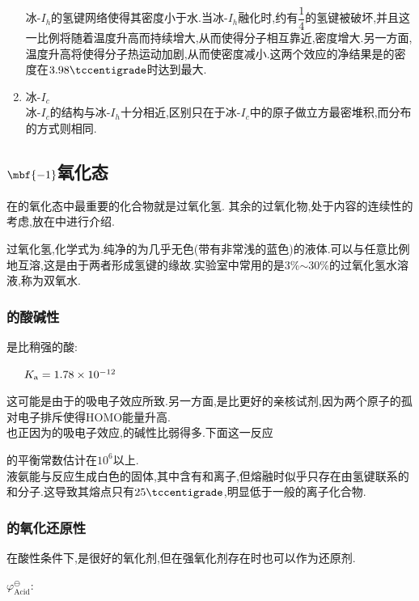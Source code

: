 \documentclass{ctexart}
\begin{document}
\begin{enumerate}[label=\tbf{\arabic*},topsep=0pt,parsep=0pt,itemsep=0pt,partopsep=0pt]
\begin{derivation}
        \end{derivation}
        冰-$I_h$的氢键网络使得其密度小于水.当冰-$I_h$融化时,约有$\dfrac14$的氢键被破坏,并且这一比例将随着温度升高而持续增大,从而使得分子相互靠近,密度增大.另一方面,温度升高将使得分子热运动加剧,从而使密度减小.这两个效应的净结果是的密度在$3.98\tccentigrade$时达到最大.
    \item 冰-$I_c$\\
        冰-$I_c$的结构与冰-$I_h$十分相近,区别只在于冰-$I_c$中的原子做立方最密堆积,而分布的方式则相同.
\end{enumerate}
\subsection{$\mbf{-1}$氧化态}
在的氧化态中最重要的化合物就是过氧化氢.%
其余的过氧化物,处于内容的连续性的考虑,放在中进行介绍.
\begin{substance}[\ce{H2O2}]
    过氧化氢,化学式为.纯净的为几乎无色(带有非常浅的蓝色)的液体.可以与任意比例地互溶,这是由于两者形成氢键的缘故.实验室中常用的是3\%$\sim$30\%的过氧化氢水溶液,称为双氧水.
\end{substance}
\subsubsection{的酸碱性}
是比稍强的酸:
\begin{center}
    \ \ \ $K_\text a=1.78\times10^{-12}$
\end{center}
这可能是由于的吸电子效应所致.另一方面,是比更好的亲核试剂,因为两个原子的孤对电子排斥使得HOMO能量升高.\\
\indent 也正因为的吸电子效应,的碱性比弱得多.下面这一反应
\begin{center}
\end{center}
的平衡常数估计在$10^6$以上.\\
\indent 液氨能与反应生成白色的固体,其中含有和离子,但熔融时似乎只存在由氢键联系的和分子.这导致其熔点只有$25\tccentigrade$,明显低于一般的离子化合物.
\subsubsection{的氧化还原性}在酸性条件下,是很好的氧化剂,但在强氧化剂存在时也可以作为还原剂.
\begin{center}
    $\varphi^\ominus_{\text{Acid}}$:\ \ \ 
\end{center}
\end{document}

